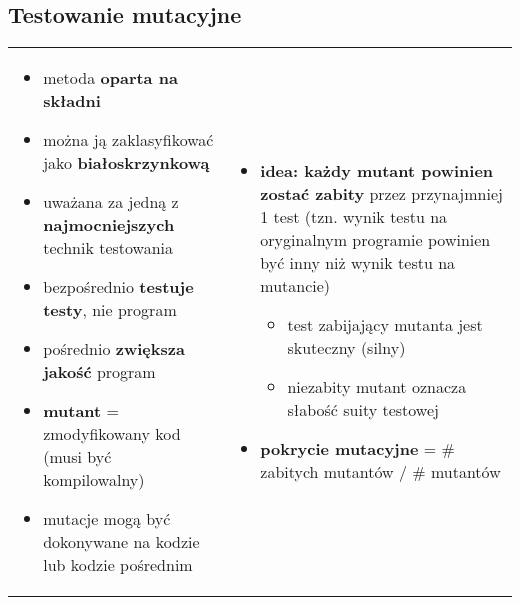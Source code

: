 \documentclass[../main.tex]{subfiles}
\begin{document}
    \subsection{Testowanie mutacyjne}
    \begin{table}[H]
        \begin{center}
            \begin{tabular}{p{8cm} p{8cm}}
                \begin{itemize}
                    \item metoda \textbf{oparta na składni}
                    \item można ją zaklasyfikować jako \textbf{białoskrzynkową}
                    \item uważana za jedną z \textbf{najmocniejszych} technik testowania
                    \item bezpośrednio \textbf{testuje testy}, nie program
                    \item pośrednio \textbf{zwiększa jakość} program
                    \item \textbf{mutant} = zmodyfikowany kod (musi być kompilowalny)
                    \item mutacje mogą być dokonywane na kodzie lub kodzie pośrednim
                \end{itemize}
                &
                \begin{itemize}
                    \item \textbf{idea: każdy mutant powinien zostać zabity} przez
                    przynajmniej 1 test (tzn. wynik testu na oryginalnym
                    programie powinien być inny niż wynik testu na mutancie)
                    \begin{itemize}
                        \item test zabijający mutanta jest skuteczny (silny)
                        \item niezabity mutant oznacza słabość suity testowej
                    \end{itemize}
                    \item \textbf{pokrycie mutacyjne} = \# zabitych mutantów / \# mutantów
                \end{itemize}
            \end{tabular}
        \end{center}
    \end{table}
\end{document}
